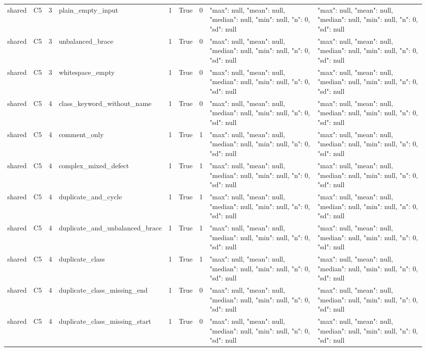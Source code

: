 \begin{tabular}{lllllllll}
shared & C5 & 3 & plain\_empty\_input & 1 & True & 0 & {"max": null, "mean": null, "median": null, "min": null, "n": 0, "sd": null} & {"max": null, "mean": null, "median": null, "min": null, "n": 0, "sd": null} \\
shared & C5 & 3 & unbalanced\_brace & 1 & True & 0 & {"max": null, "mean": null, "median": null, "min": null, "n": 0, "sd": null} & {"max": null, "mean": null, "median": null, "min": null, "n": 0, "sd": null} \\
shared & C5 & 3 & whitespace\_empty & 1 & True & 0 & {"max": null, "mean": null, "median": null, "min": null, "n": 0, "sd": null} & {"max": null, "mean": null, "median": null, "min": null, "n": 0, "sd": null} \\
shared & C5 & 4 & class\_keyword\_without\_name & 1 & True & 0 & {"max": null, "mean": null, "median": null, "min": null, "n": 0, "sd": null} & {"max": null, "mean": null, "median": null, "min": null, "n": 0, "sd": null} \\
shared & C5 & 4 & comment\_only & 1 & True & 1 & {"max": null, "mean": null, "median": null, "min": null, "n": 0, "sd": null} & {"max": null, "mean": null, "median": null, "min": null, "n": 0, "sd": null} \\
shared & C5 & 4 & complex\_mixed\_defect & 1 & True & 1 & {"max": null, "mean": null, "median": null, "min": null, "n": 0, "sd": null} & {"max": null, "mean": null, "median": null, "min": null, "n": 0, "sd": null} \\
shared & C5 & 4 & duplicate\_and\_cycle & 1 & True & 1 & {"max": null, "mean": null, "median": null, "min": null, "n": 0, "sd": null} & {"max": null, "mean": null, "median": null, "min": null, "n": 0, "sd": null} \\
shared & C5 & 4 & duplicate\_and\_unbalanced\_brace & 1 & True & 1 & {"max": null, "mean": null, "median": null, "min": null, "n": 0, "sd": null} & {"max": null, "mean": null, "median": null, "min": null, "n": 0, "sd": null} \\
shared & C5 & 4 & duplicate\_class & 1 & True & 1 & {"max": null, "mean": null, "median": null, "min": null, "n": 0, "sd": null} & {"max": null, "mean": null, "median": null, "min": null, "n": 0, "sd": null} \\
shared & C5 & 4 & duplicate\_class\_missing\_end & 1 & True & 0 & {"max": null, "mean": null, "median": null, "min": null, "n": 0, "sd": null} & {"max": null, "mean": null, "median": null, "min": null, "n": 0, "sd": null} \\
shared & C5 & 4 & duplicate\_class\_missing\_start & 1 & True & 0 & {"max": null, "mean": null, "median": null, "min": null, "n": 0, "sd": null} & {"max": null, "mean": null, "median": null, "min": null, "n": 0, "sd": null} \\

\end{tabular}
